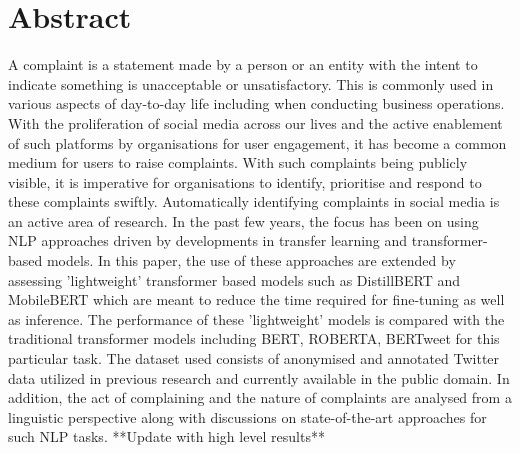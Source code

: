 \chapter*{\Large \center Abstract}

A complaint is a statement made by a person or an entity with the intent to indicate something is unacceptable or unsatisfactory. This is commonly used in various aspects of day-to-day life including when conducting business operations. With the proliferation of social media across our lives and the active enablement of such platforms by organisations for user engagement, it has become a common medium for users to raise complaints. With such complaints being publicly visible, it is imperative for organisations to identify, prioritise and respond to these complaints swiftly. Automatically identifying complaints in social media is an active area of research. In the past few years, the focus has been on using NLP approaches driven by developments in transfer learning and transformer-based models.
\newline \newline
In this paper, the use of these approaches are extended by assessing 'lightweight' transformer based models such as DistillBERT and MobileBERT which are meant to reduce the time required for fine-tuning as well as inference. The performance of these 'lightweight' models is compared with the traditional transformer models including BERT, ROBERTA, BERTweet for this particular task. The dataset used consists of anonymised and annotated Twitter data utilized in previous research and currently available in the public domain. In addition, the act of complaining and the nature of complaints are analysed from a linguistic perspective along with discussions on state-of-the-art approaches for such NLP tasks.
\newline \newline
**Update with high level results**